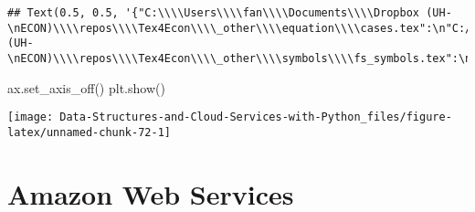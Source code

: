 \documentclass[
]{book}
\newenvironment{Shaded}{\begin{snugshade}}{\end{snugshade}}
\newcommand{\NormalTok}[1]{#1}
\begin{document}
\begin{verbatim}
## Text(0.5, 0.5, '{"C:\\\\Users\\\\fan\\\\Documents\\\\Dropbox (UH-\nECON)\\\\repos\\\\Tex4Econ\\\\_other\\\\equation\\\\cases.tex":\n"C:/Users/fan/Documents/cases.pdf",\n"C:\\\\Users\\\\fan\\\\Documents\\\\Dropbox (UH-\nECON)\\\\repos\\\\Tex4Econ\\\\_other\\\\symbols\\\\fs_symbols.tex":\n"C:/Users/fan/Documents/fs_symbols.pdf"}')
\end{verbatim}

\begin{Shaded}
\begin{Highlighting}[]
\NormalTok{ax.set\_axis\_off()}
\NormalTok{plt.show()}
\end{Highlighting}
\end{Shaded}

\begin{center}\texttt{[image: Data-Structures-and-Cloud-Services-with-Python\_files/figure-latex/unnamed-chunk-72-1]} \end{center}

\hypertarget{amazon-web-services}{%
\chapter{Amazon Web Services}\label{amazon-web-services}}
\end{document}
